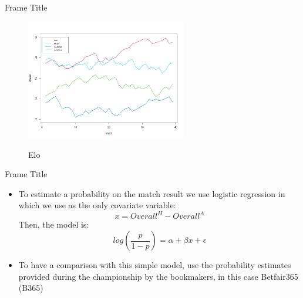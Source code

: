 \documentclass[aspectratio=169,xcolor=dvipsnames]{beamer}
\begin{document}

\begin{frame}{Frame Title}
    \begin{figure}[ht] 
        \begin{center} 
            \includegraphics[width=7cm]{Rplot7.png}\\
         \caption{Elo}
        \end{center}
    \end{figure}
\end{frame}


\begin{frame}{Frame Title}
    \begin{itemize}
        \item To estimate a probability on the match result we use logistic regression in which we use as the only covariate variable:
        \begin{equation*}
            x = Overall^{H} - Overall^A
        \end{equation*}
        Then, the model is:
        \begin{equation*}
            log(\frac{p}{1-p}) = \alpha + \beta x + \epsilon
        \end{equation*}
        \item To have a comparison with this simple model, use the probability estimates provided during the championship by the bookmakers, in this case Betfair365 (B365)
    \end{itemize}
\end{frame}

\end{document}
